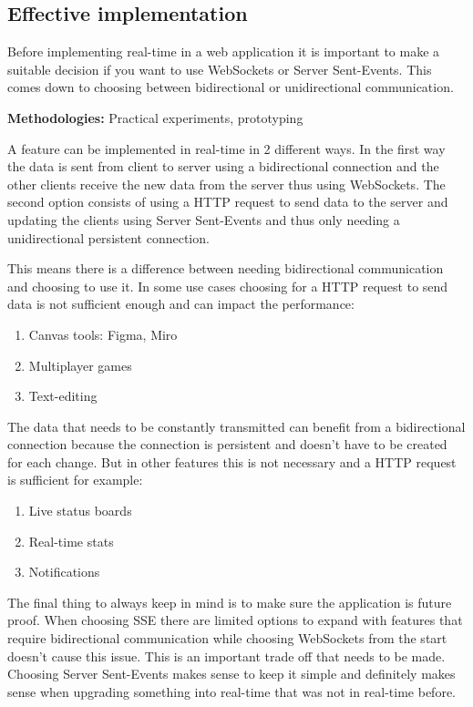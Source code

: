 \newpage

\subsection{Effective implementation}

Before implementing real-time in a web application it is important to make a suitable decision if you want to use WebSockets or Server Sent-Events. This comes down to choosing between bidirectional or unidirectional communication.

\textbf{Methodologies:} Practical experiments, prototyping

A feature can be implemented in real-time in 2 different ways. In the first way the data is sent from client to server using a bidirectional connection and the other clients receive the new data from the server thus using WebSockets. The second option consists of using a HTTP request to send data to the server and updating the clients using Server Sent-Events and thus only needing a unidirectional persistent connection.

This means there is a difference between needing bidirectional communication and choosing to use it. In some use cases choosing for a HTTP request to send data is not sufficient enough and can impact the performance:

\begin{enumerate}
  \item Canvas tools: Figma, Miro
  \item Multiplayer games
  \item Text-editing
\end{enumerate}

The data that needs to be constantly transmitted can benefit from a bidirectional connection because the connection is persistent and doesn't have to be created for each change. But in other features this is not necessary and a HTTP request is sufficient for example:

\begin{enumerate}
  \item Live status boards
  \item Real-time stats
  \item Notifications
\end{enumerate}

The final thing to always keep in mind is to make sure the application is future proof. When choosing SSE there are limited options to expand with features that require bidirectional communication while choosing WebSockets from the start doesn't cause this issue. This is an important trade off that needs to be made. Choosing Server Sent-Events makes sense to keep it simple and definitely makes sense when upgrading something into real-time that was not in real-time before.


